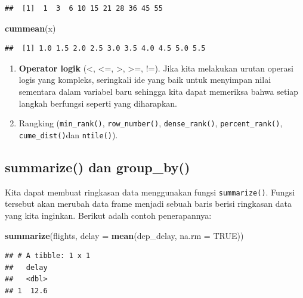 \documentclass[]{book}
\newenvironment{Shaded}{\begin{snugshade}}{\end{snugshade}}
\newcommand{\KeywordTok}[1]{\textcolor[rgb]{0.13,0.29,0.53}{\textbf{#1}}}
\newcommand{\DataTypeTok}[1]{\textcolor[rgb]{0.13,0.29,0.53}{#1}}
\newcommand{\OtherTok}[1]{\textcolor[rgb]{0.56,0.35,0.01}{#1}}
\newcommand{\NormalTok}[1]{#1}
\begin{document}
\begin{verbatim}
##  [1]  1  3  6 10 15 21 28 36 45 55
\end{verbatim}

\begin{Shaded}
\begin{Highlighting}[]
\KeywordTok{cummean}\NormalTok{(x)}
\end{Highlighting}
\end{Shaded}

\begin{verbatim}
##  [1] 1.0 1.5 2.0 2.5 3.0 3.5 4.0 4.5 5.0 5.5
\end{verbatim}

\begin{enumerate}
\def\labelenumi{\arabic{enumi}.}
\setcounter{enumi}{4}
\item
  \textbf{Operator logik} (\textless{}, \textless{}=, \textgreater{},
  \textgreater{}=, !=). Jika kita melakukan urutan operasi logis yang
  kompleks, seringkali ide yang baik untuk menyimpan nilai sementara
  dalam variabel baru sehingga kita dapat memeriksa bahwa setiap langkah
  berfungsi seperti yang diharapkan.
\item
  Rangking (\texttt{min\_rank()}, \texttt{row\_number()},
  \texttt{dense\_rank()}, \texttt{percent\_rank()},
  \texttt{cume\_dist()}dan \texttt{ntile()}).
\end{enumerate}

\subsection{summarize() dan group\_by()}\label{summarize-dan-group_by}

Kita dapat membuat ringkasan data menggunakan fungsi
\texttt{summarize()}. Fungsi tersebut akan merubah data frame menjadi
sebuah baris berisi ringkasan data yang kita inginkan. Berikut adalh
contoh penerapannya:

\begin{Shaded}
\begin{Highlighting}[]
\KeywordTok{summarize}\NormalTok{(flights, }\DataTypeTok{delay =} \KeywordTok{mean}\NormalTok{(dep_delay, }\DataTypeTok{na.rm =} \OtherTok{TRUE}\NormalTok{))}
\end{Highlighting}
\end{Shaded}

\begin{verbatim}
## # A tibble: 1 x 1
##   delay
##   <dbl>
## 1  12.6
\end{verbatim}
\end{document}
